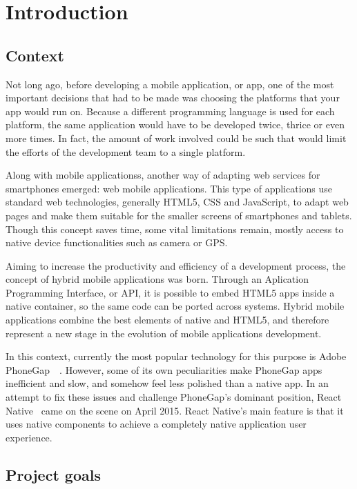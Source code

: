 \chapter{Introduction}
\label{ch:intro}
\justifying
\section{Context}
Not long ago, before developing a mobile application, or app, one of the most important decisions that had to be made was choosing the platforms that your app would run on. Because a different programming language is used for each platform, the same application would have to be developed twice, thrice or even more times. In fact, the amount of work involved could be such that would limit the efforts of the development team to a single platform.

Along with mobile applicationss, another way of adapting web services for smartphones emerged: web mobile applications. This type of applications use standard web technologies, generally HTML5, CSS and JavaScript, to adapt web pages and make them suitable for the smaller screens of smartphones and tablets. Though this concept saves time, some vital limitations remain, mostly access to native device functionalities such as camera or GPS.

Aiming to increase the productivity and efficiency of a development process, the concept of hybrid mobile applications was born. Through an Aplication Programming Interface, or API, it is possible to embed HTML5 apps inside a native container, so the same code can be ported across systems. Hybrid mobile applications combine the best elements of native and HTML5, and therefore represent a new stage in the evolution of mobile applications development.

In this context, currently the most popular technology for this purpose is Adobe PhoneGap~~\cite{phonegap}. However, some of its own peculiarities make PhoneGap apps inefficient and slow, and somehow feel less polished  than a native app. In an attempt to fix these issues and challenge PhoneGap's dominant position, React Native~\cite{reactnative} came on the scene on April 2015. React Native's main feature is that it uses native components to achieve a completely native application user experience.

\section{Project goals}

